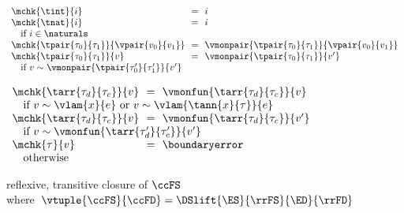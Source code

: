 \begin{flushleft}
\medskip
{}
\begin{minipage}[t]{\columnwidth}
$\begin{array}{l@{~~}c@{~~}l}
  \mchk{\tint}{i} & = & i
\\
  \mchk{\tnat}{i} & = & i
\\ \multicolumn{3}{l}{\mbox{\quad if $i \in \naturals$}}
\\
  \mchk{\tpair{\tau_0}{\tau_1}}{\vpair{v_0}{v_1}} & = & \vmonpair{\tpair{\tau_0}{\tau_1}}{\vpair{v_0}{v_1}}
\\
  \mchk{\tpair{\tau_0}{\tau_1}}{v} & = & \vmonpair{\tpair{\tau_0}{\tau_1}}{v'}
\\ \multicolumn{3}{l}{\mbox{\quad if $v \sim \vmonpair{\tpair{\tau_0'}{\tau_1'}}{v'}$}}
\end{array}$
\end{minipage}%
\begin{minipage}[t]{\columnwidth}
$\begin{array}{l@{~~}c@{~~}l}
  \mchk{\tarr{\tau_d}{\tau_c}}{v} & = & \vmonfun{\tarr{\tau_d}{\tau_c}}{v}
\\ \multicolumn{3}{l}{\mbox{\quad if $v \sim \vlam{x}{e}$ or $v \sim \vlam{\tann{x}{\tau}}{e}$}}
\\
  \mchk{\tarr{\tau_d}{\tau_c}}{v} & = & \vmonfun{\tarr{\tau_d}{\tau_c}}{v'}
\\ \multicolumn{3}{l}{\mbox{\quad if $v \sim \vmonfun{\tarr{\tau_d'}{\tau_c'}}{v'}$}}
\\
  \mchk{\tau}{v} & = & \boundaryerror
\\ \multicolumn{3}{l}{\mbox{\quad otherwise}}
\end{array}$
\end{minipage}

\medskip
{} reflexive, transitive closure of $\ccFS$\\
\mbox{\quad where $\vtuple{\ccFS}{\ccFD} = \DSlift{\ES}{\rrFS}{\ED}{\rrFD}$}
\smallskip
\end{flushleft}
